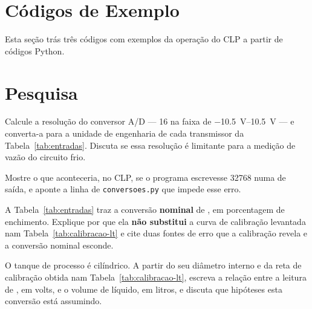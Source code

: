 \section{Códigos de Exemplo}
Esta seção trás três códigos com exemplos da operação do CLP a partir de códigos Python.





\section{Pesquisa}

\begin{roteiro}
  \item Calcule a resolução do conversor A/D --- \qty{16}{\bits} na faixa de \qtyrange{-10,5}{+10,5}{\volt}
    --- e converta-a para a unidade de engenharia de cada transmissor da Tabela~\ref{tab:entradas}. Discuta se essa resolução é limitante para a medição de vazão do circuito frio.
  \item Mostre o que aconteceria, no CLP, se o programa escrevesse \num{32768} numa  de saída, e aponte a linha de \texttt{conversoes.py} que impede esse erro.

  \item A Tabela~\ref{tab:entradas} traz a conversão \textbf{nominal} de , em porcentagem de enchimento. Explique por que ela \textbf{não substitui} a curva de calibração levantada nam Tabela~\ref{tab:calibracao-lt} e cite duas fontes de erro que a calibração revela e a conversão nominal esconde.
  
  \item O tanque de processo é cilíndrico. A partir do seu diâmetro interno e da reta de calibração obtida nam Tabela~\ref{tab:calibracao-lt}, escreva a relação entre a leitura de , em volts, e o volume de líquido, em litros, e discuta que hipóteses esta conversão está assumindo.

\end{roteiro}

